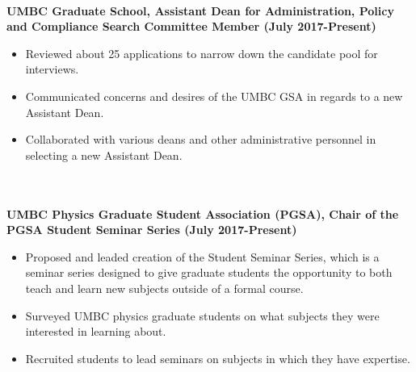 \documentclass{article}
\begin{document}
\phantom\\
%
%
%
%
\noindent \textbf{UMBC Graduate School, Assistant Dean for Administration, Policy and Compliance Search Committee Member (July 2017-Present)}
\phantom \\
\begin{itemize}
\item Reviewed about 25 applications to narrow down the candidate pool for interviews.
\item Communicated concerns and desires of the UMBC GSA in regards to a new Assistant Dean.
\item Collaborated with various deans and other administrative personnel in selecting a new Assistant Dean.
\end{itemize}
\phantom \\
\phantom\\
%
%
%
%
\noindent \textbf{UMBC Physics Graduate Student Association (PGSA), Chair of the PGSA Student Seminar Series (July 2017-Present)}
\phantom \\
\begin{itemize}
\item Proposed and leaded creation of the Student Seminar Series, which is a seminar series designed to give graduate students the opportunity to both teach and learn new subjects outside of a formal course.
\item Surveyed UMBC physics graduate students on what subjects they were interested in learning about.
\item Recruited students to lead seminars on subjects in which they have expertise.
\end{itemize}
\phantom \\
\phantom\\
%
%
%
%
\par
\phantom \\
\phantom \\
\end{document}
